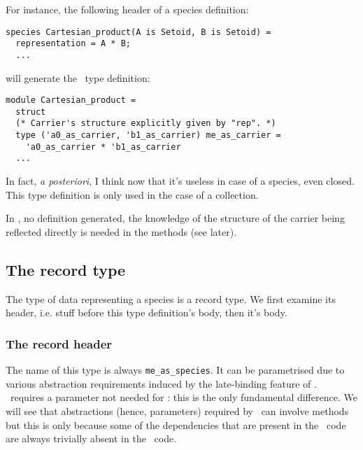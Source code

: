 For instance, the following header of a species definition:

{\footnotesize
\begin{lstlisting}
species Cartesian_product(A is Setoid, B is Setoid) =
  representation = A * B;
  ...
\end{lstlisting}
}
will generate the \ocaml\ type definition:

\label{ocaml-tydef-for-defined-repr}
{\footnotesize
\begin{lstlisting}[language=MyOCaml]
module Cartesian_product =
  struct
  (* Carrier's structure explicitly given by "rep". *)
  type ('a0_as_carrier, 'b1_as_carrier) me_as_carrier =
    'a0_as_carrier * 'b1_as_carrier
  ...
\end{lstlisting}
}

In fact, {\em a posteriori}, I think now that it's useless in case
of a species, even closed. This type definition is only used in the
case of a collection.

\medskip
In \coq, no definition generated, the knowledge of the structure of
the carrier being reflected directly is needed in the methods (see
later).



\subsection{The record type}
The type of data representing a species is a record type. We first
examine its header, i.e. stuff before this type definition's body,
then it's body.


\subsubsection{The record header}
The name of this type is always {\tt me\_as\_species}. It can be
parametrised due to various abstraction requirements induced by the
late-binding feature of \focalize. \ocaml\ requires a parameter not
needed for \coq: this is the only fundamental difference. We will see
that abstractions (hence, parameters) required by \coq\ can involve
methods but this is only because some of the dependencies that are
present in the \coq\ code are always trivially absent in the
\ocaml\ code.


